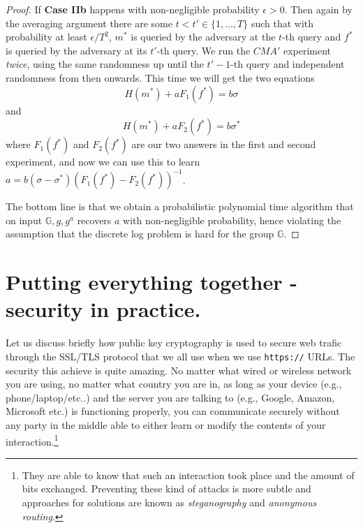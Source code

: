 \begin{proof}
If \textbf{Case IIb} happens with non-negligible probability
\(\epsilon>0\). Then again by the averaging argument there are some
\(t< t' \in \{1,\ldots,T\}\) such that with probability at least
\(\epsilon/T^2\), \(m^*\) is queried by the adversary at the \(t\)-th
query and \(f^*\) is queried by the adversary at its \(t'\)-th query. We
run the \(\ensuremath{\mathit{CMA}}'\) experiment \emph{twice}, using
the same randomness up until the \(t'-1\)-th query and independent
randomness from then onwards. This time we will get the two equations
\[H(m^*)+aF_1(f^*) = b\sigma\] and \[H(m^*)+aF_2(f^*)=b\sigma^*\] where
\(F_1(f^*)\) and \(F_2(f^*)\) are our two answers in the first and
second experiment, and now we can use this to learn
\(a= b(\sigma-\sigma^*)(F_1(f^*)-F_2(f^*))^{-1}\).

The bottom line is that we obtain a probabilistic polynomial time
algorithm that on input \(\mathbb{G},g,g^a\) recovers \(a\) with
non-negligible probability, hence violating the assumption that the
discrete log problem is hard for the group \(\mathbb{G}\).

\end{proof}

\hypertarget{nonromsec}{}

\section{Putting everything together - security in
practice.}\label{Putting-everything-togeth}

Let us discuss briefly how public key cryptography is used to secure web
trafic through the SSL/TLS protocol that we all use when we use
\texttt{https://} URLs. The security this achieve is quite amazing. No
matter what wired or wireless network you are using, no matter what
country you are in, as long as your device (e.g., phone/laptop/etc..)
and the server you are talking to (e.g., Google, Amazon, Microsoft etc.)
is functioning properly, you can communicate securely without any party
in the middle able to either learn or modify the contents of your
interaction.\footnote{They are able to know that such an interaction
  took place and the amount of bits exchanged. Preventing these kind of
  attacks is more subtle and approaches for solutions are known as
  \emph{steganography} and \emph{anonymous routing}.}

